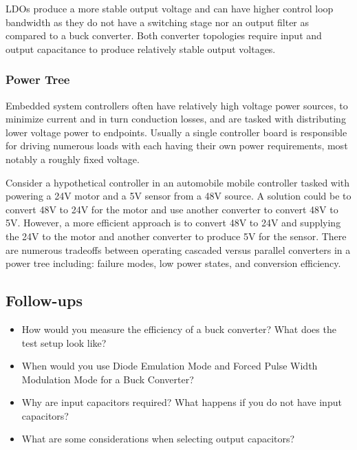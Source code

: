 \documentclass[main.tex]{subfiles}
\begin{document}
\newnoindentpara LDOs produce a more stable output voltage and can have higher control loop bandwidth as they do not have a switching stage nor an output filter as compared to a buck converter. Both converter topologies require input and output capacitance to produce relatively stable output voltages.

\subsubsection{Power Tree}
Embedded system controllers often have relatively high voltage power sources, to minimize current and in turn conduction losses, and are tasked with distributing lower voltage power to endpoints. Usually a single controller board is responsible for driving numerous loads with each having their own power requirements, most notably a roughly fixed voltage. \newline

\newnoindentpara Consider a hypothetical controller in an automobile mobile controller tasked with powering a 24V motor and a 5V sensor from a 48V source. A solution could be to convert 48V to 24V for the motor and use another converter to convert 48V to 5V. However, a more efficient approach is to convert 48V to 24V and supplying the 24V to the motor and another converter to produce 5V for the sensor. There are numerous tradeoffs between operating cascaded versus parallel converters in a power tree including: failure modes, low power states, and conversion efficiency. 

\subsection{Follow-ups}
\begin{itemize}
    \item How would you measure the efficiency of a buck converter? What does the test setup look like? %
    \item When would you use Diode Emulation Mode and Forced Pulse Width Modulation Mode for a Buck Converter?  %
    \item Why are input capacitors required? What happens if you do not have input capacitors? %
    \item What are some considerations when selecting output capacitors? %
\end{itemize}
\end{document}
